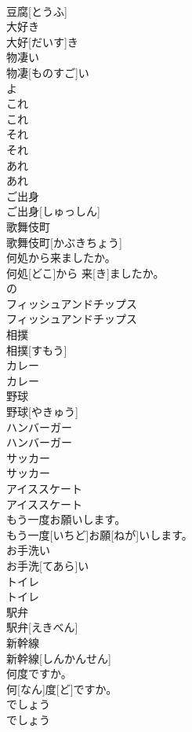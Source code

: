 \documentclass[8pt]{extreport}
\begin{document}
\begin{CJK}{UTF8}{min}
\\	豆腐[とうふ]
\\	大好き	
\\	大好[だいす]き
\\	物凄い	
\\	物凄[ものすご]い
\\	よ
\\	これ	
\\	これ
\\	それ	
\\	それ
\\	あれ	
\\	あれ
\\	ご出身	
\\	ご出身[しゅっしん]
\\	歌舞伎町	
\\	歌舞伎町[かぶきちょう]
\\	何処から来ましたか。	
\\	何処[どこ]から 来[き]ましたか。
\\	の
\\	フィッシュアンドチップス	
\\	フィッシュアンドチップス
\\	相撲	
\\	相撲[すもう]
\\	カレー	
\\	カレー
\\	野球	
\\	野球[やきゅう]
\\	ハンバーガー	
\\	ハンバーガー
\\	サッカー	
\\	サッカー
\\	アイススケート	
\\	アイススケート
\\	もう一度お願いします。	
\\	もう一度[いちど]お願[ねが]いします。
\\	お手洗い	
\\	お手洗[てあら]い
\\	トイレ	
\\	トイレ
\\	駅弁	
\\	駅弁[えきべん]
\\	新幹線	
\\	新幹線[しんかんせん]
\\	何度ですか。	
\\	何[なん]度[ど]ですか。
\\	でしょう	
\\	でしょう

\end{CJK}
\end{document}
